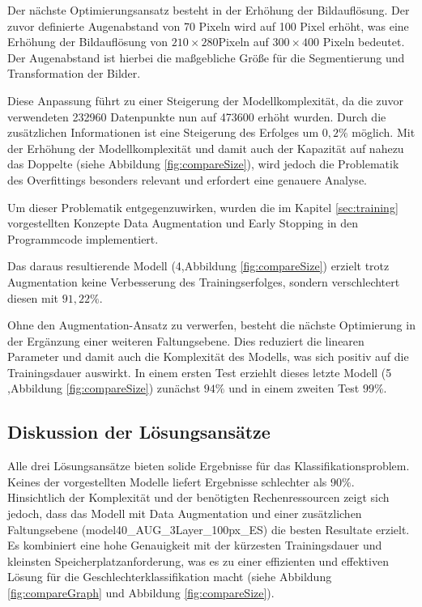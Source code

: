 \documentclass[journal,twoside,web]{ieeecolor}
\begin{document}
Der nächste Optimierungsansatz besteht in der Erhöhung der Bildauflösung. Der zuvor definierte Augenabstand von 70 Pixeln wird auf 100 Pixel erhöht, was eine Erhöhung der Bildauflösung von \(210\times280\)Pixeln auf \(300\times400\) Pixeln bedeutet. Der Augenabstand ist hierbei die maßgebliche Größe für die Segmentierung und Transformation der Bilder.

Diese Anpassung führt zu einer Steigerung der Modellkomplexität, da die zuvor verwendeten 232960 Datenpunkte nun auf 473600 erhöht wurden. 
Durch die zusätzlichen Informationen ist eine Steigerung des Erfolges um $0,2\%$ möglich. Mit der Erhöhung der Modellkomplexität und damit auch der Kapazität auf nahezu das Doppelte (siehe Abbildung \ref{fig:compareSize}), wird jedoch die Problematik des Overfittings besonders relevant und erfordert eine genauere Analyse.

Um dieser Problematik entgegenzuwirken, wurden die im Kapitel \ref{sec:training} vorgestellten Konzepte Data Augmentation und Early Stopping in den Programmcode implementiert.

Das daraus resultierende Modell (4,Abbildung \ref{fig:compareSize}) erzielt trotz Augmentation keine Verbesserung des Trainingserfolges, sondern verschlechtert diesen mit $91,22 \%$. 

Ohne den Augmentation-Ansatz zu verwerfen, besteht die nächste Optimierung in der Ergänzung einer weiteren Faltungsebene. Dies reduziert die linearen Parameter und damit auch die Komplexität des Modells, was sich positiv auf die Trainingsdauer auswirkt. In einem ersten Test erziehlt dieses letzte Modell (5 ,Abbildung \ref{fig:compareSize}) zunächst $94 \%$ und in einem zweiten Test $99 \%$.

\subsection{Diskussion der Lösungsansätze}
Alle drei Lösungsansätze bieten solide Ergebnisse für das Klassifikationsproblem. Keines der vorgestellten Modelle liefert Ergebnisse schlechter als $90\%$. Hinsichtlich der Komplexität und der benötigten Rechenressourcen zeigt sich jedoch, dass das Modell mit Data Augmentation und einer zusätzlichen Faltungsebene (model40\_AUG\_3Layer\_100px\_ES) die besten Resultate erzielt. Es kombiniert eine hohe Genauigkeit mit der kürzesten Trainingsdauer und kleinsten Speicherplatzanforderung, was es zu einer effizienten und effektiven Lösung für die Geschlechterklassifikation macht (siehe Abbildung \ref{fig:compareGraph} und Abbildung \ref{fig:compareSize}).
\end{document}
